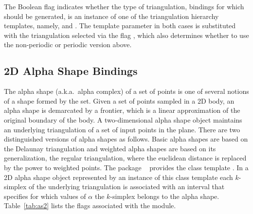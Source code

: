 The \cmake{} Boolean flag  indicates
whether the type of triangulation, bindings for which should be
generated, is an instance of one of the triangulation hierarchy
templates, namely,
 and
.
The template parameter in both cases is substituted with the
triangulation selected via the \cmake{} flag
, which also determines whether to use the
non-periodic or periodic version above.

\subsection{2D Alpha Shape Bindings}
\label{ssec:modules:as2}
The alpha shape (a.k.a.\ alpha complex) of a set of points is one of
several notions of a shape formed by the set. Given a set of points
sampled in a 2D body, an alpha shape is demarcated by a frontier,
which is a linear approximation of the original boundary of the
body. A two-dimensional alpha shape object maintains an underlying
triangulation of a set of input points in the plane. There are two
distinguished versions of alpha shapes as follows. Basic alpha shapes
are based on the Delaunay triangulation and weighted alpha shapes are
based on its generalization, the regular triangulation, where the
euclidean distance is replaced by the power to weighted points.  The
package \iiDAlphaShapesPackage{}~\cite{cgal:d-as2-21a} provides the
class template . In a 2D alpha shape object represented by
an instance of this class template each $k$-simplex of the underlying
triangulation is associated with an interval that specifies for which
values of $\alpha$ the $k$-simplex belongs to the alpha shape.
Table~\ref{tab:as2} lists the \cmake{} flags associated with the
\iiDAlphaShapesPackage{} module.

\begin{table}[!htp]
  \caption{\iiiDAlphaShapesPackage{} module flags}
  \centering{}
 \label{tab:as2}
\end{table}

